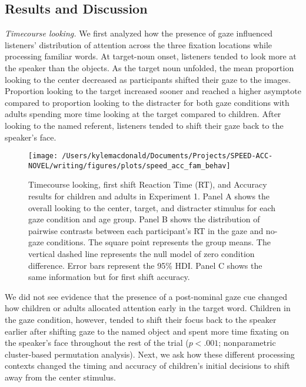 \documentclass[man,floatsintext]{apa6}
\begin{document}
\subsection{Results and Discussion}\label{results-and-discussion}

\emph{Timecourse looking.} We first analyzed how the presence of gaze
influenced listeners' distribution of attention across the three
fixation locations while processing familiar words. At target-noun
onset, listeners tended to look more at the speaker than the objects. As
the target noun unfolded, the mean proportion looking to the center
decreased as participants shifted their gaze to the images. Proportion
looking to the target increased sooner and reached a higher asymptote
compared to proportion looking to the distracter for both gaze
conditions with adults spending more time looking at the target compared
to children. After looking to the named referent, listeners tended to
shift their gaze back to the speaker's face.

\begin{figure}[!t]

{\centering \texttt{[image: /Users/kylemacdonald/Documents/Projects/SPEED-ACC-NOVEL/writing/figures/plots/speed\_acc\_fam\_behav]} 

}

\caption{Timecourse looking, first shift Reaction Time (RT), and Accuracy results for children and adults in Experiment 1. Panel A shows the overall looking to the center, target, and distracter stimulus for each gaze condition and age group. Panel B shows the distribution of pairwise contrasts between each participant's RT in the gaze and no-gaze conditions. The square point represents the group means. The vertical dashed line represents the null model of zero condition difference. Error bars represent the 95\% HDI. Panel C shows the same information but for first shift accuracy.}\label{fig:speed-acc-gaze-results}
\end{figure}

We did not see evidence that the presence of a post-nominal gaze cue
changed how children or adults allocated attention early in the target
word. Children in the gaze condition, however, tended to shift their
focus back to the speaker earlier after shifting gaze to the named
object and spent more time fixating on the speaker's face throughout the
rest of the trial (\(p < .001\); nonparametric cluster-based permutation
analysis). Next, we ask how these different processing contexts changed
the timing and accuracy of children's initial decisions to shift away
from the center stimulus.
\end{document}
